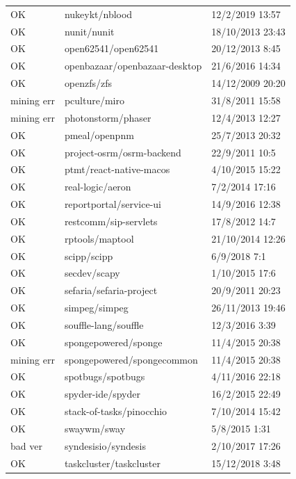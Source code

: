 \begin{appendices}
\begin{center}
\begin{longtable}{|l|l|l|}
            OK & nukeykt/nblood & 12/2/2019 13:57 \\
            OK & nunit/nunit & 18/10/2013 23:43 \\
            OK & open62541/open62541 & 20/12/2013 8:45 \\
            OK & openbazaar/openbazaar-desktop & 21/6/2016 14:34 \\
            OK & openzfs/zfs & 14/12/2009 20:20 \\
            mining err & pculture/miro & 31/8/2011 15:58 \\
            mining err & photonstorm/phaser & 12/4/2013 12:27 \\
            OK & pmeal/openpnm & 25/7/2013 20:32 \\
            OK & project-osrm/osrm-backend & 22/9/2011 10:5 \\
            OK & ptmt/react-native-macos & 4/10/2015 15:22 \\
            OK & real-logic/aeron & 7/2/2014 17:16 \\
            OK & reportportal/service-ui & 14/9/2016 12:38 \\
            OK & restcomm/sip-servlets & 17/8/2012 14:7 \\
            OK & rptools/maptool & 21/10/2014 12:26 \\
            OK & scipp/scipp & 6/9/2018 7:1 \\
            OK & secdev/scapy & 1/10/2015 17:6 \\
            OK & sefaria/sefaria-project & 20/9/2011 20:23 \\
            OK & simpeg/simpeg & 26/11/2013 19:46 \\
            OK & souffle-lang/souffle & 12/3/2016 3:39 \\
            OK & spongepowered/sponge & 11/4/2015 20:38 \\
            mining err & spongepowered/spongecommon & 11/4/2015 20:38 \\
            OK & spotbugs/spotbugs & 4/11/2016 22:18 \\
            OK & spyder-ide/spyder & 16/2/2015 22:49 \\
            OK & stack-of-tasks/pinocchio & 7/10/2014 15:42 \\
            OK & swaywm/sway & 5/8/2015 1:31 \\
            bad ver & syndesisio/syndesis & 2/10/2017 17:26 \\
            OK & taskcluster/taskcluster & 15/12/2018 3:48 \\

\end{longtable}
\end{center}
\end{appendices}
